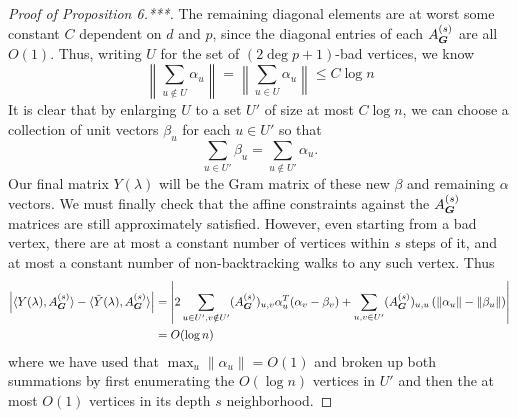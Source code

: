 \begin{proof}[Proof of Proposition 6.***]
    The remaining diagonal elements are at worst some constant $C$ dependent on $d$ and $p$, since the diagonal entries of each $A^{(s)}_{\boldsymbol{G}}$ are all $O(1)$. Thus, writing $U$ for the set of $(2\deg p + 1)$-bad vertices, we know
    $$
        \left\|\sum_{u \notin U} \alpha_u \right\| = \left\|\sum_{u\in U} \alpha_u \right\| \le C\log n
    $$
    It is clear that by enlarging $U$ to a set $U'$ of size at most $C\log n$, we can choose a collection of unit vectors $\beta_u$ for each $u \in U'$ so that $$
        \sum_{u \in U'} \beta_u = \sum_{u\notin U'} \alpha_u. 
    $$
    Our final matrix $Y(\lambda)$ will be the Gram matrix of these new $\beta$ and remaining $\alpha$ vectors. We must finally check that the affine constraints against the $A^{(s)}_{\boldsymbol{G}}$ matrices are still approximately satisfied. However, even starting from a bad vertex, there are at most a constant number of vertices within $s$ steps of it, and at most a constant number of non-backtracking walks to any such vertex. Thus
    \begin{align*}
        \left|\langle Y(\lambda),A^{(s)}_{\boldsymbol{G}} \rangle - \langle \tilde Y(\lambda),A^{(s)}_{\boldsymbol{G}} \rangle \right| &= \left| 2\sum_{u\in U',v\notin U'} (A^{(s)}_{\boldsymbol{G}})_{u,v}\alpha_u^T(\alpha_v - \beta_v) + \sum_{u,v\in U'} (A^{(s)}_{\boldsymbol{G}})_{u,u}\left(\|\alpha_u\| - \|\beta_u\|\right)\right| \\
        &= O(\log n)
    \end{align*}
    where we have used that $\max_u \|\alpha_u\| = O(1)$ and broken up both summations by first enumerating the $O(\log n)$ vertices in $U'$ and then the at most $O(1)$ vertices in its depth $s$ neighborhood.
\end{proof}

